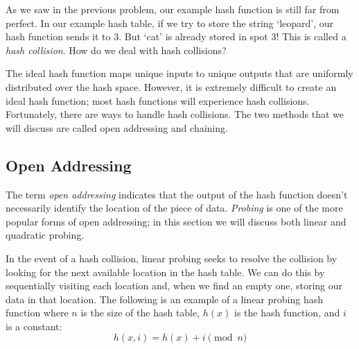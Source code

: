As we saw in the previous problem, our example hash function is still far from perfect.
In our example hash table, if we try to store the string `leopard', our hash function sends it to 3.
But `cat' is already stored in spot 3!
This is called a \emph{hash collision}.
How do we deal with hash collisions?
\begin{figure}
\end{figure}

The ideal hash function maps unique inputs to unique outputs that are uniformly distributed over the hash space.
However, it is extremely difficult to create an ideal hash function; most hash functions will experience hash collisions.
Fortunately, there are ways to handle hash collisions.
The two methods that we will discuss are called open addressing and chaining.

\subsection*{Open Addressing}
The term \emph{open addressing} indicates that the output of the hash function doesn't necessarily identify the location of the piece of data.
\emph{Probing} is one of the more popular forms of open addressing; in this section we will discuss both linear and quadratic probing.

In the event of a hash collision, linear probing seeks to resolve the collision by looking for the next available location in the hash table.
We can do this by sequentially visiting each location and, when we find an empty one, storing our data in that location.
The following is an example of a linear probing hash function where $n$ is the size of the hash table, $h(x)$ is the hash function, and $i$ is a constant:
\begin{equation*}
h(x, i) = h(x) + i \pmod{n}
\end{equation*}

